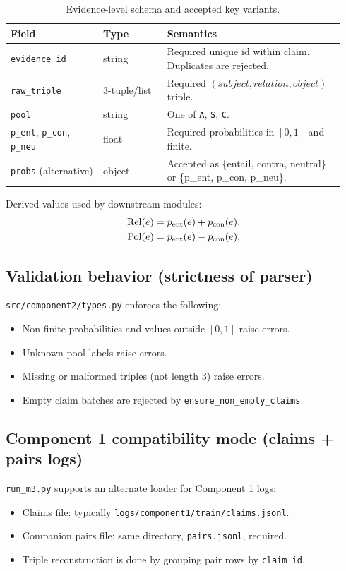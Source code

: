 \begin{table}[H]
\centering
\begin{tabular}{@{}p{0.26\linewidth}p{0.18\linewidth}p{0.50\linewidth}@{}}
\toprule
Field & Type & Semantics \\
\midrule
\texttt{evidence\_id} & string & Required unique id within claim. Duplicates are rejected. \\
\texttt{raw\_triple} & 3-tuple/list & Required $(subject, relation, object)$ triple. \\
\texttt{pool} & string & One of \texttt{A}, \texttt{S}, \texttt{C}. \\
\texttt{p\_ent}, \texttt{p\_con}, \texttt{p\_neu} & float & Required probabilities in $[0,1]$ and finite. \\
\texttt{probs} (alternative) & object & Accepted as \{entail, contra, neutral\} or \{p\_ent, p\_con, p\_neu\}. \\
\bottomrule
\end{tabular}
\caption{Evidence-level schema and accepted key variants.}
\label{tab:evidence-schema}
\end{table}

Derived values used by downstream modules:
\begin{align}
\operatorname{Rel}(e) &= p_{\text{ent}}(e) + p_{\text{con}}(e), \\
\operatorname{Pol}(e) &= p_{\text{ent}}(e) - p_{\text{con}}(e).
\end{align}

\subsection{Validation behavior (strictness of parser)}
\texttt{src/component2/types.py} enforces the following:
\begin{itemize}
\item Non-finite probabilities and values outside $[0,1]$ raise errors.
\item Unknown pool labels raise errors.
\item Missing or malformed triples (not length 3) raise errors.
\item Empty claim batches are rejected by \texttt{ensure\_non\_empty\_claims}.
\end{itemize}

\subsection{Component 1 compatibility mode (claims + pairs logs)}
\label{subsec:component1-compat}
\texttt{run\_m3.py} supports an alternate loader for Component 1 logs:
\begin{itemize}
\item Claims file: typically \texttt{logs/component1/train/claims.jsonl}.
\item Companion pairs file: same directory, \texttt{pairs.jsonl}, required.
\item Triple reconstruction is done by grouping pair rows by \texttt{claim\_id}.
\end{itemize}


